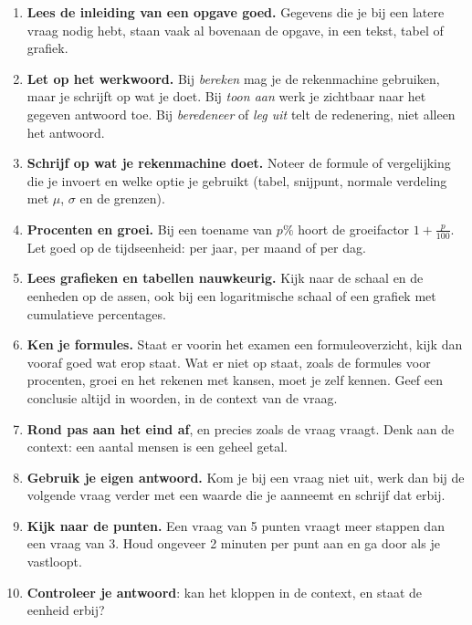 {\small\opmaakproza
\begin{enumerate}[leftmargin=1.5em,itemsep=3pt,label=\textcolor{kleur1}{\sffamily\bfseries\arabic*}]
\item \textbf{Lees de inleiding van een opgave goed.} Gegevens die je bij een latere vraag nodig hebt, staan vaak
  al bovenaan de opgave, in een tekst, tabel of grafiek.
\item \textbf{Let op het werkwoord.} Bij \emph{bereken} mag je de rekenmachine gebruiken, maar je schrijft op wat je
  doet. Bij \emph{toon aan} werk je zichtbaar naar het gegeven antwoord toe. Bij \emph{beredeneer} of \emph{leg uit}
  telt de redenering, niet alleen het antwoord.
\item \textbf{Schrijf op wat je rekenmachine doet.} Noteer de formule of vergelijking die je invoert en welke optie je
  gebruikt (tabel, snijpunt, normale verdeling met $\mu$, $\sigma$ en de grenzen).
\item \textbf{Procenten en groei.} Bij een toename van $p\%$ hoort de groeifactor $1 + \frac{p}{100}$. Let goed op de
  tijdseenheid: per jaar, per maand of per dag.
\item \textbf{Lees grafieken en tabellen nauwkeurig.} Kijk naar de schaal en de eenheden op de assen, ook bij een
  logaritmische schaal of een grafiek met cumulatieve percentages.
\item \textbf{Ken je formules.} Staat er voorin het examen een formuleoverzicht, kijk dan vooraf goed wat erop
  staat. Wat er niet op staat, zoals de formules voor procenten, groei en het rekenen met kansen, moet je zelf kennen.
  Geef een conclusie altijd in woorden, in de context van de vraag.
\item \textbf{Rond pas aan het eind af}, en precies zoals de vraag vraagt. Denk aan de context: een aantal mensen is
  een geheel getal.
\item \textbf{Gebruik je eigen antwoord.} Kom je bij een vraag niet uit, werk dan bij de volgende vraag verder met een
  waarde die je aanneemt en schrijf dat erbij.
\item \textbf{Kijk naar de punten.} Een vraag van 5 punten vraagt meer stappen dan een vraag van 3. Houd ongeveer
  2 minuten per punt aan en ga door als je vastloopt.
\item \textbf{Controleer je antwoord}: kan het kloppen in de context, en staat de eenheid erbij?
\end{enumerate}\par}
